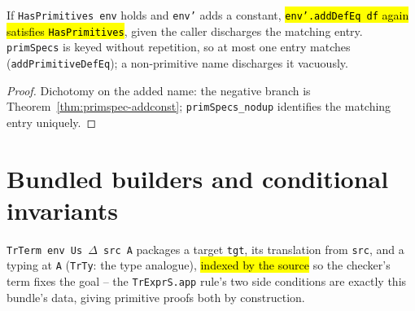 \begin{theorem}
\label{thm:hasprimitives-addconst}
\leanok
{}
 If \texttt{HasPrimitives env} holds and \texttt{env'} adds a constant, \hl{\texttt{env'.addDefEq df} again satisfies \texttt{HasPrimitives}}, given the caller discharges the matching entry. \texttt{primSpecs} is keyed without repetition, so at most one entry matches (\texttt{addPrimitiveDefEq}); a non-primitive name discharges it vacuously.
\end{theorem}
\begin{proof}
\leanok
{} Dichotomy on the added name: the negative branch is Theorem~\ref{thm:primspec-addconst}; \texttt{primSpecs\_nodup} identifies the matching entry uniquely.
\end{proof}

\section{Bundled builders and conditional invariants}

\begin{definition}
\label{struct:trterm}
\leanok
{}
 \texttt{TrTerm env Us $\Delta$ src A} packages a target \texttt{tgt}, its translation from \texttt{src}, and a typing at \texttt{A} (\texttt{TrTy}: the type analogue), \hl{indexed by the source} so the checker's term fixes the goal -- the \texttt{TrExprS.app} rule's two side conditions are exactly this bundle's data, giving primitive proofs both by construction.
\end{definition}


